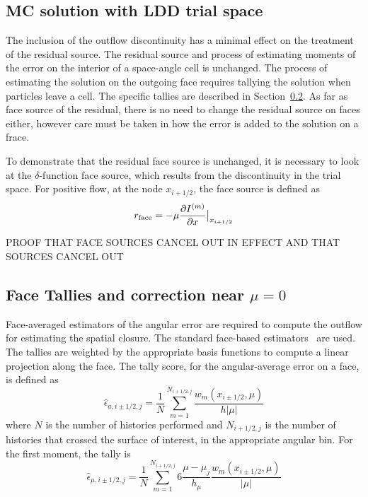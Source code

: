 
\subsection{MC solution with LDD trial space}

The inclusion of the outflow discontinuity has a minimal effect on the treatment of the
residual source. The residual source and process of estimating moments of
the error on the interior of a space-angle cell is unchanged.  The process of estimating
the solution on the outgoing face requires tallying the solution when particles leave a
cell. The specific
tallies are described in Section~\ref{sec:face_tallies}.  As far as face source of the
residual, there is no need to change the residual source on faces either, however care
must be taken in how the error is added to the solution on a frace.  

To demonstrate that the residual face source is unchanged, it is necessary to look at the
$\delta$-function face source, which results from the discontinuity in the trial space.  For
positive flow, at the node $x_{i+1/2}$, the face source is defined as
\begin{equation}
    r_{\text{face}} = -\mu \frac{\partial I^{(m)}}{\partial x}\big|_{x_{i+1/2}}  
\end{equation}

PROOF THAT FACE SOURCES CANCEL OUT IN EFFECT AND THAT SOURCES CANCEL OUT




\subsection{Face Tallies and correction near $\mu=0$}
\label{sec:face_tallies}

Face-averaged estimators of the angular error are required to compute the outflow for
estimating the spatial closure. The standard face-based
estimators~\cite{shultis_mc,favorite_faces} are used.  The tallies are weighted by
the appropriate basis functions to compute a linear projection along the face.  The
tally score, for the angular-average error on a face, is defined as
\begin{equation}
    \hat \epsilon_{a,i\pm1/2,j} = \frac{1}{N} \sum_{m=1}^{N_{i+1/2,j}}
\frac{w_m(x_{i\pm1/2},\mu)}{h |\mu|}
\end{equation}
where $N$ is the number of histories performed and $N_{i+1/2,j}$ is the number of histories
that crossed the surface of interest, in the appropriate angular bin. For the first
moment, the tally is
\begin{equation}
    \hat \epsilon_{\mu,i\pm1/2,j} = \frac{1}{N} \sum_{m=1}^{N_{i+1/2,j}} 
        6\frac{\mu-\mu_j}{h_\mu} \frac{w_m(x_{i\pm1/2},\mu)}{|\mu|}
\end{equation}

